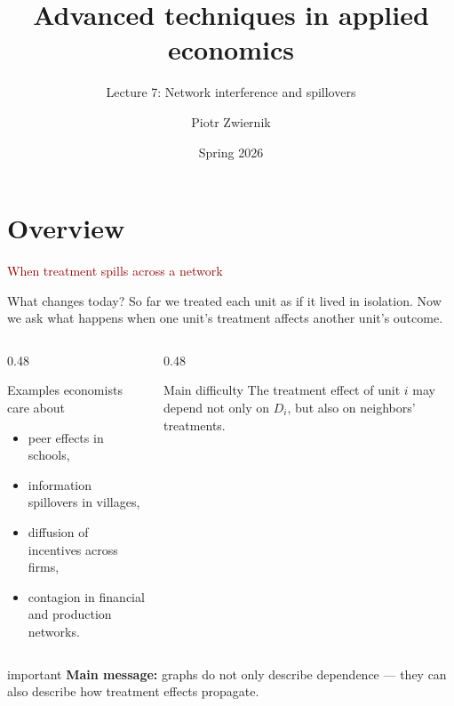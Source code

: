 \documentclass[dvipsnames,aspectratio=169,handout]{beamer}
\title{Advanced techniques in applied economics}
\subtitle{Lecture 7: Network interference and spillovers}
\author{Piotr Zwiernik}
\date{Spring 2026}
\begin{document}
\begin{frame}
\titlepage
\end{frame}

\section{Overview}

\begin{frame}{}
\begin{center}
{\huge \textcolor{DarkRed}{When treatment spills across a network}}
\end{center}
\end{frame}

\begin{frame}{What changes today?}
So far we treated each unit as if it lived in isolation.
Now we ask what happens when one unit's treatment affects another unit's outcome.

\begin{columns}[T]
\begin{column}{0.48\textwidth}
\begin{block}{Examples economists care about}
\begin{itemize}
    \item peer effects in schools,
    \item information spillovers in villages,
    \item diffusion of incentives across firms,
    \item contagion in financial and production networks.
\end{itemize}
\end{block}
\end{column}
\begin{column}{0.48\textwidth}
\begin{block}{Main difficulty}
The treatment effect of unit $i$ may depend not only on $D_i$, but also on neighbors' treatments.
\end{block}
\end{column}
\end{columns}

\begin{beamercolorbox}[wd=\textwidth,sep=8pt,center,rounded=true,shadow=true]{important}
\textbf{Main message:}
graphs do not only describe dependence --- they can also describe how treatment effects propagate.
\end{beamercolorbox}
\end{frame}
\end{document}
